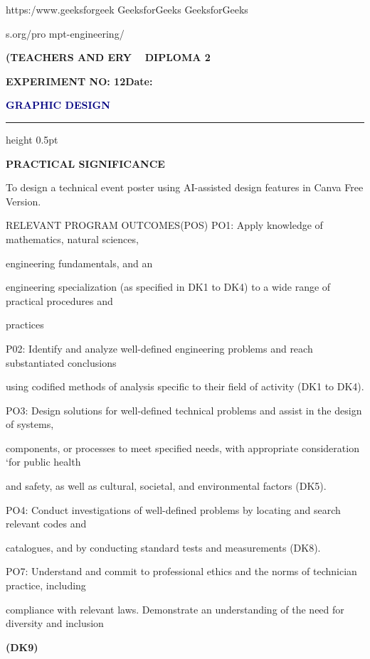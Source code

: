 \documentclass[10pt,a4paper]{article}
\newcommand{\expheading}[2]{%
  \vspace{0.1cm}\noindent\textbf{\large EXPERIMENT NO: #1}\hfill\textbf{Date: #2}\par
}
\newcommand{\exptitle}[1]{%
  \begin{center}\vspace{-2mm}\textcolor{navy}{\fontsize{20}{22}\selectfont\bfseries #1}\end{center}
  \vspace{1mm}\hrule height 0.5pt\vspace{3mm}
}
\begin{document}
                           https:/www.geeksforgeek   GeeksforGeeks      GeeksforGeeks\par
\noindent s.org/pro                                    mpt-engineering/\par

\medskip\noindent\textbf{(TEACHERS AND ERY ~ DIPLOMA 2}\par
\clearpage
\expheading{12}{\underline{\hspace{1.8cm}}}
\exptitle{GRAPHIC DESIGN}
\medskip\noindent\textbf{PRACTICAL SIGNIFICANCE}\par
\noindent To design a technical event poster using AI-assisted design features in Canva Free Version.\par
\noindent RELEVANT PROGRAM OUTCOMES(POS) PO1: Apply knowledge of mathematics, natural sciences,\par
\noindent engineering fundamentals, and an\par
\noindent engineering specialization (as specified in DK1 to DK4) to a wide range of practical procedures and\par
\noindent practices\par
\noindent P02: Identify and analyze well-defined engineering problems and reach substantiated conclusions\par
\noindent using codified methods of analysis specific to their field of activity (DK1 to DK4).\par
\noindent PO3: Design solutions for well-defined technical problems and assist in the design of systems,\par
\noindent components, or processes to meet specified needs, with appropriate consideration ‘for public health\par
\noindent and safety, as well as cultural, societal, and environmental factors (DK5).\par
\noindent PO4: Conduct investigations of well-defined problems by locating and search relevant codes and\par
\noindent catalogues, and by conducting standard tests and measurements (DK8).\par
\noindent PO7: Understand and commit to professional ethics and the norms of technician practice, including\par
\noindent compliance with relevant laws. Demonstrate an understanding of the need for diversity and inclusion\par
\medskip\noindent\textbf{(DK9)}\par
\end{document}
